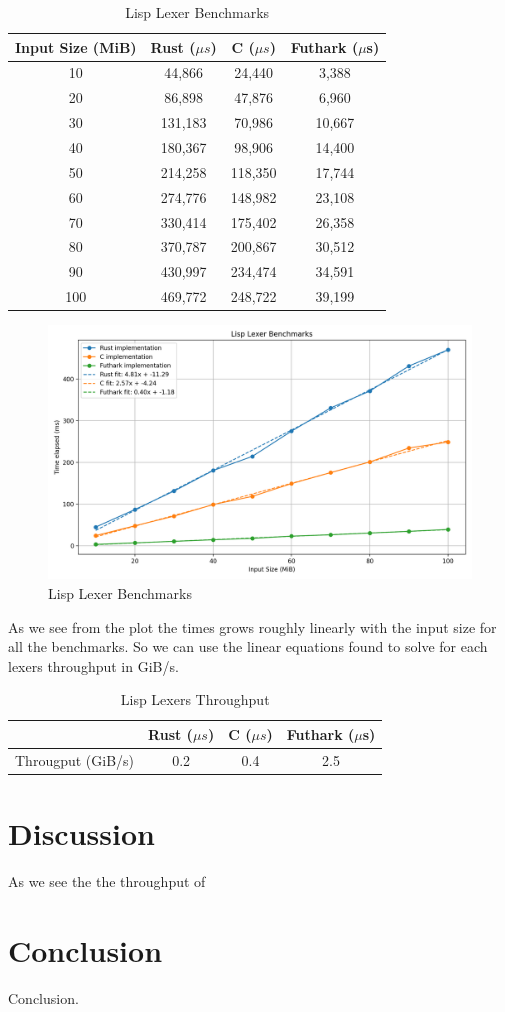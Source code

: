 \documentclass[a4paper,12pt]{article}
\theoremstyle{definition}
\begin{document}
\begin{table}[H]
  \centering
  \begin{tabular}{c|c|c|c}
    Input Size (MiB) & Rust ($\mu s$) & C ($\mu s$) & Futhark ($\mu$s) \\ \hline
    10 & 44,866 & 24,440 & 3,388 \\
    20 & 86,898 & 47,876 & 6,960 \\
    30 & 131,183 & 70,986 & 10,667 \\
    40 & 180,367 & 98,906 & 14,400 \\
    50 & 214,258 & 118,350 & 17,744 \\
    60 & 274,776 & 148,982 & 23,108 \\
    70 & 330,414 & 175,402 & 26,358 \\
    80 & 370,787 & 200,867 & 30,512 \\
    90 & 430,997 & 234,474 & 34,591 \\
    100 & 469,772 & 248,722 & 39,199
  \end{tabular}
  \caption{Lisp Lexer Benchmarks}
\end{table}

\begin{figure}[H]
  \centering
  \includegraphics[width=\linewidth]{plot.png}
  \caption{Lisp Lexer Benchmarks}
\end{figure}
\noindent As we see from the plot the times grows roughly linearly with the input size for all the benchmarks. So we can use the linear equations found to solve for each lexers throughput in GiB/s.
\begin{table}[H]
  \centering
  \begin{tabular}{c|c|c|c}
     & Rust ($\mu s$) & C ($\mu s$) & Futhark ($\mu$s) \\ \hline
    Througput (GiB/s) & 0.2 & 0.4 & 2.5 \\
  \end{tabular}
  \caption{Lisp Lexers Throughput}
\end{table}

\section{Discussion}
As we see the the throughput of 
\section{Conclusion}
Conclusion.
\printbibliography
\end{document}
